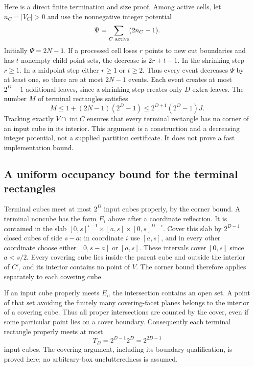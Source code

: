 Here is a direct finite termination and size proof. Among active cells,
let $n_C=|V_C|>0$ and use the nonnegative integer potential
\[
 \Psi=\sum_{C\ {\rm active}}(2n_C-1).
\]
Initially $\Psi=2N-1$. If a processed cell loses $r$ points to new cut
boundaries and has $t$ nonempty child point sets, the decrease is
$2r+t-1$. In the shrinking step $r\geq1$. In a midpoint step either
$r\geq1$ or $t\geq2$. Thus every event decreases $\Psi$ by at least one,
so there are at most $2N-1$ events. Each event creates at most $2^D-1$
additional leaves, since a shrinking step creates only $D$ extra leaves.
The number $M$ of terminal rectangles satisfies
\begin{equation}\label{eq:explicit-first-size}
 M\leq1+(2N-1)(2^D-1)
 \leq2^{D+1}(2^D-1)J.
\end{equation}
Tracking exactly $V\cap\operatorname{int}C$ ensures that every terminal
rectangle has no corner of an input cube in its interior. This argument
is a construction and a decreasing integer potential, not a supplied
partition certificate. It does not prove a fast implementation bound.

\subsection{A uniform occupancy bound for the terminal rectangles}
Terminal cubes meet at most $2^D$ input cubes properly, by the corner bound.
A terminal noncube has the form $E_i$ above after a coordinate reflection.
It is contained in the slab $[0,s]^{i-1}\times[a,s]\times[0,s]^{D-i}$.
Cover this slab by $2^{D-1}$ closed cubes of side $s-a$: in coordinate $i$
use $[a,s]$, and in every other coordinate choose either $[0,s-a]$ or
$[a,s]$. These intervals cover $[0,s]$ since $a<s/2$.
Every covering cube lies inside the parent cube and outside the interior
of $C'$, and its interior contains no point of $V$. The corner bound
therefore applies separately to each covering cube.

If an input cube properly meets $E_i$, the intersection contains an open
set. A point of that set avoiding the finitely many covering-facet planes
belongs to the interior of a covering cube. Thus all proper intersections
are counted by the cover, even if some particular point lies on a cover
boundary. Consequently each terminal rectangle properly meets at most
\begin{equation}\label{eq:explicit-occupancy}
 T_D=2^{D-1}2^D=2^{2D-1}
\end{equation}
input cubes. The covering argument, including its boundary qualification,
is proved here; no arbitrary-box unclutteredness is assumed.

